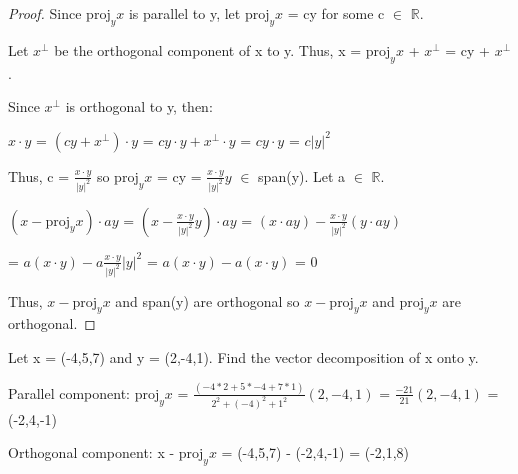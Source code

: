     \begin{proof}
        Since $\text{proj}_yx$ is parallel to y, let
        $\text{proj}_yx$ = cy for some c $\in$ $\mathbb{R}$.

        Let $x^{\perp}$ be the orthogonal component of x to y.
        Thus, x = $\text{proj}_yx$ + $x^{\perp}$ = cy + $x^{\perp}$.

        Since $x^{\perp}$ is orthogonal to y, then:

        \hspace{0.5cm}
        $x \cdot y$
        = $(cy + x^{\perp}) \cdot y$
        = $cy \cdot y + x^{\perp} \cdot y$
        = $c y \cdot y$
        = $c|y|^2$

        Thus, c = $\frac{x \cdot y}{|y|^2}$
        so $\text{proj}_yx$ = cy = $\frac{x \cdot y}{|y|^2}y$
        $\in$ span(y).
        Let a $\in$ $\mathbb{R}$.

        \hspace{0.5cm}
        $(x - \text{proj}_yx) \cdot ay$
        = $(x - \frac{x \cdot y}{|y|^2}y) \cdot ay$
        = $(x \cdot ay) - \frac{x \cdot y}{|y|^2}(y \cdot ay)$

        \hspace{3.6cm}
        = $a(x \cdot y) - a\frac{x \cdot y}{|y|^2}|y|^2$
        = $a(x \cdot y) - a(x \cdot y)$
        = 0

        Thus, $x - \text{proj}_yx$ and span(y) are orthogonal
        so $x - \text{proj}_yx$ and $\text{proj}_yx$ are orthogonal.
    \end{proof}

    \vspace{0.5cm}



    \begin{example}
        Let x = (-4,5,7) and y = (2,-4,1). Find the vector decomposition
        of x onto y.
    \end{example}

    \begin{tbox}
        Parallel component:
        \hspace{0.5cm}
        $\text{proj}_yx$
        = $\frac{(-4*2 + 5*-4 + 7*1)}{2^2 + (-4)^2 + 1^2}(2,-4,1)$
        = $\frac{-21}{21}(2,-4,1)$ = (-2,4,-1)

        Orthogonal component:
        \hspace{0.5cm}
        x - $\text{proj}_yx$
        = (-4,5,7) - (-2,4,-1)
        = (-2,1,8)
    \end{tbox}

